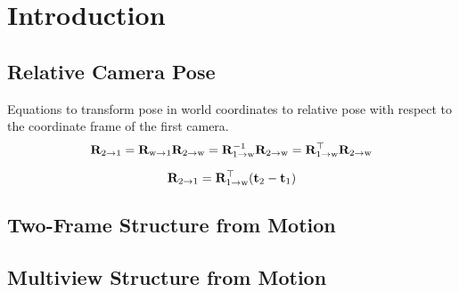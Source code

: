 \chapter{Introduction}

	\section{Relative Camera Pose}
		Equations to transform pose in world coordinates to relative pose with respect to the coordinate frame of the first camera.
		\begin{equation}
			\mathbf{R}_{2 \rightarrow 1} 	= \mathbf{R}_{\text{w} \rightarrow 1} \mathbf{R}_{2 \rightarrow \text{w}}
										= \mathbf{R}_{1 \rightarrow \text{w}}^{-1} \mathbf{R}_{2 \rightarrow \text{w}}
										= \mathbf{R}_{1 \rightarrow \text{w}}^{\top} \mathbf{R}_{2 \rightarrow \text{w}}
		\end{equation}
		
		\begin{equation}
			\mathbf{R}_{2 \rightarrow 1} = \mathbf{R}_{1 \rightarrow \text{w}}^{\top} (\mathbf{t}_2 - \mathbf{t}_1)
		\end{equation}

	\section{Two-Frame Structure from Motion}
	
	\section{Multiview Structure from Motion}